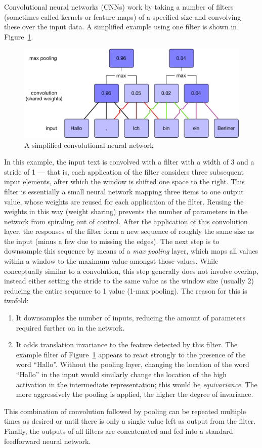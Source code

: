 Convolutional neural networks (CNNs) work by taking a number of filters
(sometimes called kernels or feature maps) of a specified size and convolving
these over the input data. A simplified example using one filter is shown in
Figure~\ref{fig:cnn}.
\begin{figure}[htb]
  \centering
  \includegraphics[width=\textwidth]{figures/cnn.pdf}
  \caption{A simplified convolutional neural network}
  \label{fig:cnn}
\end{figure}
In this example, the input text is convolved with a filter with a width of 3 and
a stride of 1 --- that is, each application of the filter considers three
subsequent input elements, after which the window is shifted one space to the
right. This filter is essentially a small neural network mapping three items to
one output value, whose weights are reused for each application of the filter.
Reusing the weights in this way (weight sharing) prevents the number of
parameters in the network from spiraling out of control.
\citep{lecun1995convolutional} After the application of this convolution layer,
the responses of the filter form a new sequence of roughly the same size as the
input (minus a few due to missing the edges). The next step is to downsample
this sequence by means of a \emph{max pooling} layer, which maps all values
within a window to the maximum value amongst those values. While conceptually
similar to a convolution, this step generally does not involve overlap, instead
either setting the stride to the same value as the window size (usually 2)
reducing the entire sequence to 1 value (1-max pooling). The reason for this is
twofold:
\begin{enumerate}
\item It downsamples the number of inputs, reducing the amount of parameters
  required further on in the network.
\item It adds translation invariance to the feature detected by this filter. The
  example filter of Figure~\ref{fig:cnn} appears to react strongly to the
  presence of the word ``Hallo''. Without the pooling layer, changing the
  location of the word ``Hallo'' in the input would similarly change the
  location of the high activation in the intermediate representation; this would
  be \emph{equivariance}. The more aggressively the pooling is applied, the
  higher the degree of invariance.
\end{enumerate}
This combination of convolution followed by pooling can be repeated multiple
times as desired or until there is only a single value left as output from the
filter. Finally, the outputs of all filters are concatenated and fed into a
standard feedforward neural network.

